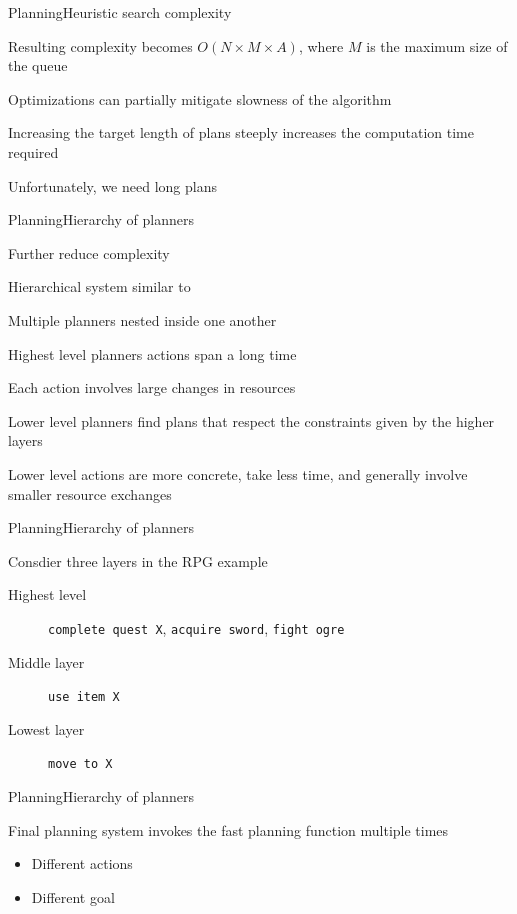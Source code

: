 \documentclass{beamer}
\begin{document}
\begin{slide}{Planning}{Heuristic search complexity}{
\item Resulting complexity becomes $O(N \times M \times A)$, where $M$ is the maximum size of the queue
\item Optimizations can partially mitigate slowness of the algorithm
\item Increasing the target length of plans steeply increases the computation time required
\item Unfortunately, we need long plans
}\end{slide}

\begin{slide}{Planning}{Hierarchy of planners}{
\item Further reduce complexity 
\item Hierarchical system similar to \cite{HIERARCHICAL_PLANNING}
\item Multiple planners nested inside one another
\item Highest level planners actions span a long time
\item Each action involves large changes in resources
\item Lower level planners find plans that respect the constraints given by the higher layers
\item Lower level actions are more concrete, take less time, and generally involve smaller resource exchanges
}\end{slide}

\begin{slide}{Planning}{Hierarchy of planners}{
\item Consdier three layers in the RPG example
\begin{description}
\item[Highest level] \texttt{complete quest X}, \texttt{acquire sword}, \texttt{fight ogre}
\item[Middle layer] \texttt{use item X}
\item[Lowest layer] \texttt{move to X}
\end{description}
}\end{slide}

\begin{slide}{Planning}{Hierarchy of planners}{
\item Final planning system invokes the fast planning function multiple times
\begin{itemize}
\item Different actions
\item Different goal
\end{itemize}
}\end{slide}
\end{document}
